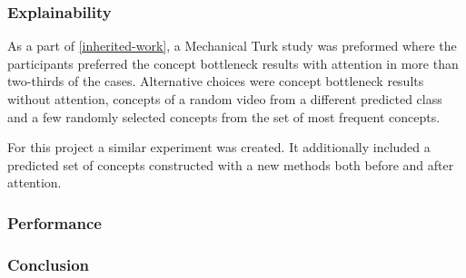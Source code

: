 \subsubsection{Explainability}

As a part of \ref{inherited-work}, a Mechanical Turk study was preformed where the participants preferred the concept bottleneck results with attention in more than two-thirds of the cases.
Alternative choices were concept bottleneck results without attention, concepts of a random video from a different predicted class and a few randomly selected concepts from the set of most frequent concepts.


For this project a similar experiment was created. 
It additionally included a predicted set of concepts constructed with a new methods both before and after attention.

\subsubsection{Performance}


\subsubsection{Conclusion}





 

